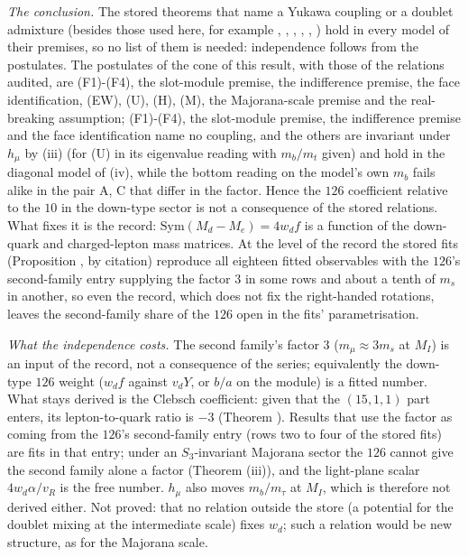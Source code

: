 \emph{The conclusion.} The stored theorems that name a Yukawa coupling or a doublet admixture (besides those used here, for example , , , , , ) hold in every model of their premises, so no list of them is needed: independence follows from the postulates. The postulates of the cone of this result, with those of the relations audited, are (F1)-(F4), the slot-module premise, the indifference premise, the face identification, (EW), (U), (H), (M), the Majorana-scale premise and the real-breaking assumption; (F1)-(F4), the slot-module premise, the indifference premise and the face identification name no coupling, and the others are invariant under $h_{\mu}$ by (iii) (for (U) in its eigenvalue reading with $m_{b}/m_{t}$ given) and hold in the diagonal model of (iv), while the bottom reading on the model's own $m_{b}$ fails alike in the pair A, C that differ in the factor. Hence the $126$ coefficient relative to the $10$ in the down-type sector is not a consequence of the stored relations. What fixes it is the record: $\mathrm{Sym}(M_{d} - M_{e}) = 4w_{d}f$ is a function of the down-quark and charged-lepton mass matrices. At the level of the record the stored fits (Proposition , by citation) reproduce all eighteen fitted observables with the $126$'s second-family entry supplying the factor $3$ in some rows and about a tenth of $m_{s}$ in another, so even the record, which does not fix the right-handed rotations, leaves the second-family share of the $126$ open in the fits' parametrisation.

\emph{What the independence costs.} The second family's factor $3$ ($m_{\mu} \approx 3m_{s}$ at $M_{I}$) is an input of the record, not a consequence of the series; equivalently the down-type $126$ weight ($w_{d}f$ against $v_{d}Y$, or $b/a$ on the module) is a fitted number. What stays derived is the Clebsch coefficient: given that the $(15,1,1)$ part enters, its lepton-to-quark ratio is $-3$ (Theorem ). Results that use the factor as coming from the $126$'s second-family entry (rows two to four of the stored fits) are fits in that entry; under an $S_{3}$-invariant Majorana sector the $126$ cannot give the second family alone a factor (Theorem (iii)), and the light-plane scalar $4w_{d}\alpha/v_{R}$ is the free number. $h_{\mu}$ also moves $m_{b}/m_{\tau}$ at $M_{I}$, which is therefore not derived either. Not proved: that no relation outside the store (a potential for the doublet mixing at the intermediate scale) fixes $w_{d}$; such a relation would be new structure, as for the Majorana scale.
